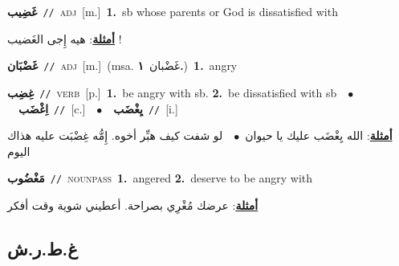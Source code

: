 \documentclass[10pt,a4paper,twoside]{article} %
\begin{document}
\begin{multicols}{2}
{\setlength\topsep{0pt}\textbf{\foreignlanguage{arabic}{غَضِيب}}\ {\color{gray}\texttt{//}\color{black}}\ \textsc{adj}\ [m.]\ \textbf{1.}~sb whose parents or God is dissatisfied with\  \begin{flushright}\color{gray}\foreignlanguage{arabic}{\textbf{\underline{\foreignlanguage{arabic}{أمثلة}}}: هيه إِجى الغَضيب !}\end{flushright}\color{black}} \vspace{2mm}

{\setlength\topsep{0pt}\textbf{\foreignlanguage{arabic}{غَضْبَان}}\ {\color{gray}\texttt{//}\color{black}}\ \textsc{adj}\ [m.]\ \color{gray}(msa. \foreignlanguage{arabic}{غَضْبان}~\foreignlanguage{arabic}{\textbf{١.}})\color{black}\ \textbf{1.}~angry\ } \vspace{2mm}

{\setlength\topsep{0pt}\textbf{\foreignlanguage{arabic}{غِضِب}}\ {\color{gray}\texttt{//}\color{black}}\ \textsc{verb}\ [p.]\ \textbf{1.}~be angry with sb.  \textbf{2.}~be dissatisfied with sb\ \ $\bullet$\ \ \setlength\topsep{0pt}\textbf{\foreignlanguage{arabic}{اِغْضَب}}\ {\color{gray}\texttt{//}\color{black}}\ [c.]\ \ $\bullet$\ \ \setlength\topsep{0pt}\textbf{\foreignlanguage{arabic}{يِغْضَب}}\ {\color{gray}\texttt{//}\color{black}}\ [i.]\  \begin{flushright}\color{gray}\foreignlanguage{arabic}{\textbf{\underline{\foreignlanguage{arabic}{أمثلة}}}: الله يِغْضَب عليك يا حيوان\ $\bullet$\ \  لو شفت كيف هبِّر أخوه. إِمُّه غِضْبَت عليه هذاك اليوم}\end{flushright}\color{black}} \vspace{2mm}

{\setlength\topsep{0pt}\textbf{\foreignlanguage{arabic}{مَغْضُوب}}\ {\color{gray}\texttt{//}\color{black}}\ \textsc{noun\textunderscore pass}\ \textbf{1.}~angered  \textbf{2.}~deserve to be angry with\  \begin{flushright}\color{gray}\foreignlanguage{arabic}{\textbf{\underline{\foreignlanguage{arabic}{أمثلة}}}: عرضك مُغْرِي بصراحة. أعطيني شوية وقت أفكر}\end{flushright}\color{black}} \vspace{2mm}

\vspace{-3mm}
\subsection*{\color{blue}\foreignlanguage{arabic}{غ.ط.ر.ش}\color{blue}{}} 


\end{multicols}
\end{document}
